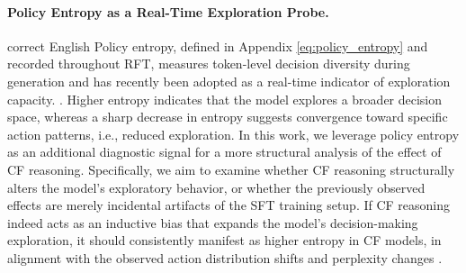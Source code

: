 \documentclass{article}
\begin{document}
\paragraph{Policy Entropy as a Real-Time Exploration Probe.}
correct English
Policy entropy, defined in Appendix \ref{eq:policy_entropy} and recorded throughout RFT, measures token-level decision diversity during generation and has recently been adopted as a real-time indicator of exploration capacity. \cite{policy-entropy:cui2025entropy, policy-entropy:liu2025prorl}. Higher entropy indicates that the model explores a broader decision space, whereas a sharp decrease in entropy suggests convergence toward specific action patterns, i.e., reduced exploration. In this work, we leverage policy entropy as an additional diagnostic signal for a more structural analysis of the effect of CF reasoning. Specifically, we aim to examine whether CF reasoning structurally alters the model’s exploratory behavior, or whether the previously observed effects are merely incidental artifacts of the SFT training setup. If CF reasoning indeed acts as an inductive bias that expands the model’s decision-making exploration, it should consistently manifest as higher entropy in CF models, in alignment with the observed action distribution shifts and perplexity changes \cite{policy-entropy:reasoning_w_exploration}.

\end{document}
